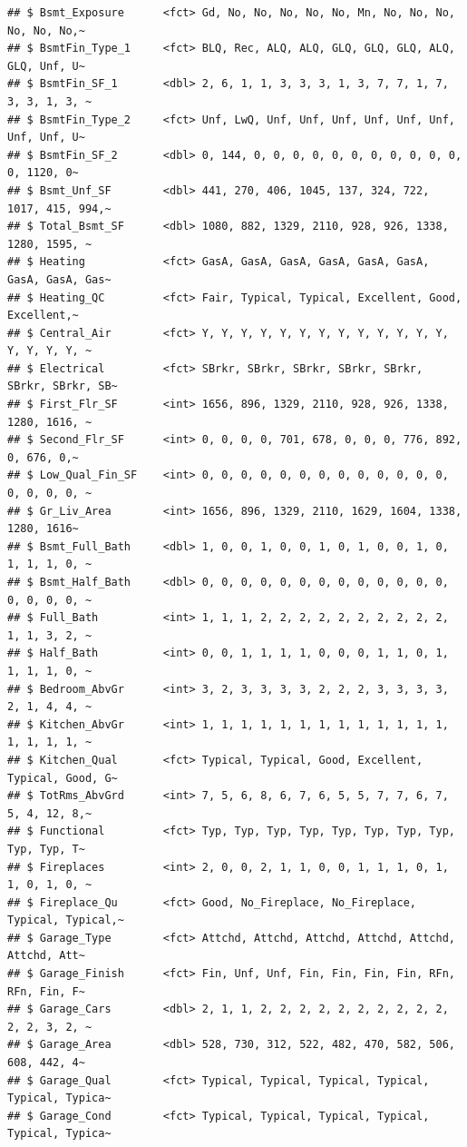 \documentclass[
]{book}
\begin{document}
\begin{verbatim}
## $ Bsmt_Exposure      <fct> Gd, No, No, No, No, No, Mn, No, No, No, No, No, No,~
## $ BsmtFin_Type_1     <fct> BLQ, Rec, ALQ, ALQ, GLQ, GLQ, GLQ, ALQ, GLQ, Unf, U~
## $ BsmtFin_SF_1       <dbl> 2, 6, 1, 1, 3, 3, 3, 1, 3, 7, 7, 1, 7, 3, 3, 1, 3, ~
## $ BsmtFin_Type_2     <fct> Unf, LwQ, Unf, Unf, Unf, Unf, Unf, Unf, Unf, Unf, U~
## $ BsmtFin_SF_2       <dbl> 0, 144, 0, 0, 0, 0, 0, 0, 0, 0, 0, 0, 0, 0, 1120, 0~
## $ Bsmt_Unf_SF        <dbl> 441, 270, 406, 1045, 137, 324, 722, 1017, 415, 994,~
## $ Total_Bsmt_SF      <dbl> 1080, 882, 1329, 2110, 928, 926, 1338, 1280, 1595, ~
## $ Heating            <fct> GasA, GasA, GasA, GasA, GasA, GasA, GasA, GasA, Gas~
## $ Heating_QC         <fct> Fair, Typical, Typical, Excellent, Good, Excellent,~
## $ Central_Air        <fct> Y, Y, Y, Y, Y, Y, Y, Y, Y, Y, Y, Y, Y, Y, Y, Y, Y, ~
## $ Electrical         <fct> SBrkr, SBrkr, SBrkr, SBrkr, SBrkr, SBrkr, SBrkr, SB~
## $ First_Flr_SF       <int> 1656, 896, 1329, 2110, 928, 926, 1338, 1280, 1616, ~
## $ Second_Flr_SF      <int> 0, 0, 0, 0, 701, 678, 0, 0, 0, 776, 892, 0, 676, 0,~
## $ Low_Qual_Fin_SF    <int> 0, 0, 0, 0, 0, 0, 0, 0, 0, 0, 0, 0, 0, 0, 0, 0, 0, ~
## $ Gr_Liv_Area        <int> 1656, 896, 1329, 2110, 1629, 1604, 1338, 1280, 1616~
## $ Bsmt_Full_Bath     <dbl> 1, 0, 0, 1, 0, 0, 1, 0, 1, 0, 0, 1, 0, 1, 1, 1, 0, ~
## $ Bsmt_Half_Bath     <dbl> 0, 0, 0, 0, 0, 0, 0, 0, 0, 0, 0, 0, 0, 0, 0, 0, 0, ~
## $ Full_Bath          <int> 1, 1, 1, 2, 2, 2, 2, 2, 2, 2, 2, 2, 2, 1, 1, 3, 2, ~
## $ Half_Bath          <int> 0, 0, 1, 1, 1, 1, 0, 0, 0, 1, 1, 0, 1, 1, 1, 1, 0, ~
## $ Bedroom_AbvGr      <int> 3, 2, 3, 3, 3, 3, 2, 2, 2, 3, 3, 3, 3, 2, 1, 4, 4, ~
## $ Kitchen_AbvGr      <int> 1, 1, 1, 1, 1, 1, 1, 1, 1, 1, 1, 1, 1, 1, 1, 1, 1, ~
## $ Kitchen_Qual       <fct> Typical, Typical, Good, Excellent, Typical, Good, G~
## $ TotRms_AbvGrd      <int> 7, 5, 6, 8, 6, 7, 6, 5, 5, 7, 7, 6, 7, 5, 4, 12, 8,~
## $ Functional         <fct> Typ, Typ, Typ, Typ, Typ, Typ, Typ, Typ, Typ, Typ, T~
## $ Fireplaces         <int> 2, 0, 0, 2, 1, 1, 0, 0, 1, 1, 1, 0, 1, 1, 0, 1, 0, ~
## $ Fireplace_Qu       <fct> Good, No_Fireplace, No_Fireplace, Typical, Typical,~
## $ Garage_Type        <fct> Attchd, Attchd, Attchd, Attchd, Attchd, Attchd, Att~
## $ Garage_Finish      <fct> Fin, Unf, Unf, Fin, Fin, Fin, Fin, RFn, RFn, Fin, F~
## $ Garage_Cars        <dbl> 2, 1, 1, 2, 2, 2, 2, 2, 2, 2, 2, 2, 2, 2, 2, 3, 2, ~
## $ Garage_Area        <dbl> 528, 730, 312, 522, 482, 470, 582, 506, 608, 442, 4~
## $ Garage_Qual        <fct> Typical, Typical, Typical, Typical, Typical, Typica~
## $ Garage_Cond        <fct> Typical, Typical, Typical, Typical, Typical, Typica~

\end{verbatim}
\end{document}
